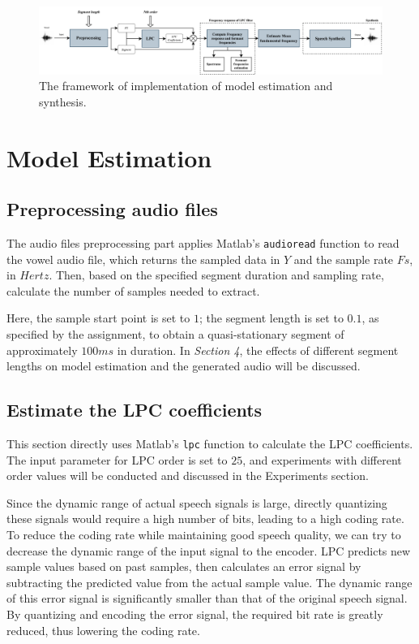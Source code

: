 \documentclass{article}
\begin{document}
\begin{figure}[ht]
  \begin{center}
  \includegraphics[width=18cm]{The framework of implementation of model estimation and synthesis}
  \end{center}
  \caption{\label{fig:framework} The framework of implementation of model estimation and synthesis.}
  \end{figure}


\section{Model Estimation}

\subsection{Preprocessing audio files}

The audio files preprocessing part applies Matlab’s \verb+audioread+ function to read the vowel audio file, which returns the sampled data in $Y$ and the sample rate $Fs$, in $Hertz$. Then, based on the specified segment duration and sampling rate, calculate the number of samples needed to extract.

Here, the sample start point is set to $1$; the segment length is set to $0.1$, as specified by the assignment, to obtain a quasi-stationary segment of approximately $100 ms$ in duration. In \textit{Section 4}, the effects of different segment lengths on model estimation and the generated audio will be discussed.


\subsection{Estimate the LPC coefficients}

This section directly uses Matlab’s \verb+lpc+ function to calculate the LPC coefficients. The input parameter for LPC order is set to $25$, and experiments with different order values will be conducted and discussed in the Experiments section.

Since the dynamic range of actual speech signals is large, directly quantizing these signals would require a high number of bits, leading to a high coding rate. To reduce the coding rate while maintaining good speech quality, we can try to decrease the dynamic range of the input signal to the encoder. LPC predicts new sample values based on past samples, then calculates an error signal by subtracting the predicted value from the actual sample value. The dynamic range of this error signal is significantly smaller than that of the original speech signal. By quantizing and encoding the error signal, the required bit rate is greatly reduced, thus lowering the coding rate\citep{kondoz2005digital}.
\end{document}
